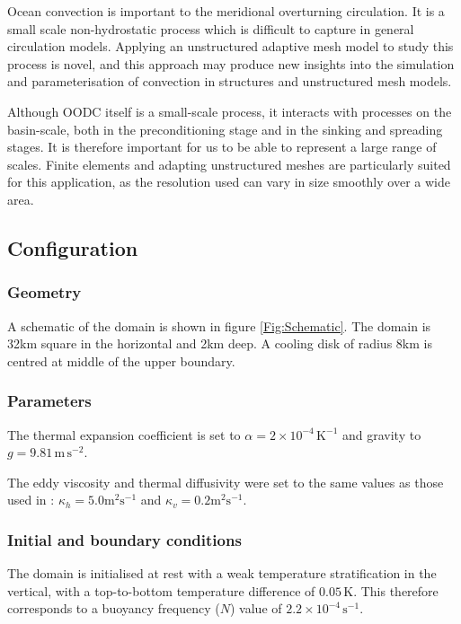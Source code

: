 Ocean convection is important to the meridional overturning
circulation. It is a small scale non-hydrostatic process which
is difficult to capture in general circulation models. Applying
an unstructured adaptive mesh model to study this process is
novel, and this approach may produce new insights into the
simulation and parameterisation of convection in structures and
unstructured mesh models.

Although OODC itself is a small-scale process, it interacts with
processes on the basin-scale, both in the preconditioning stage and
in the sinking and spreading stages. It is therefore important for us
to be able to represent a large range of scales. Finite elements and adapting
unstructured meshes are particularly suited for this application, as the
resolution used can vary in size smoothly over a wide area.

\subsection{Configuration}

\subsubsection{Geometry}



A schematic of the domain is shown in figure \ref{Fig:Schematic}.
The domain is 32km square in the horizontal and 2km deep. A cooling disk of radius
8km is centred at middle of the upper boundary.




\subsubsection{Parameters}
The thermal expansion coefficient is set to
$\alpha=2 \times 10^{-4} \,\mathrm{K}^{-1}$ and gravity to $g=9.81 \,\mathrm{m}\,\mathrm{s}^{-2}$.

The eddy viscosity
and thermal diffusivity were set to the same values as those
used in \cite{jones1993}: $\kappa_h = 5.0 \mathrm{m}^2\mathrm{s}^{-1}$ and
$\kappa_v = 0.2 \mathrm{m}^2\mathrm{s}^{-1}$.


\subsubsection{Initial and boundary conditions}
The domain is initialised at rest with a weak temperature stratification
in the vertical, with a top-to-bottom temperature difference of
$0.05\,$K.
This therefore corresponds to a buoyancy frequency ($N$) value
of $2.2 \times 10^{-4} \,\mathrm{s}^{-1}$.


